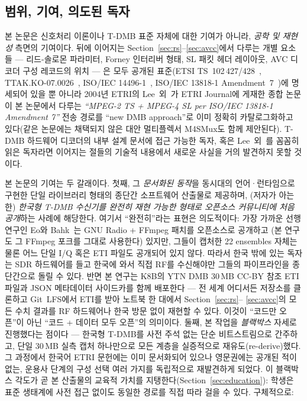 \documentclass[11pt,a4paper]{article}
\begin{document}
\subsection{범위, 기여, 의도된 독자}
본 논문은 신호처리 이론이나 T-DMB 표준 자체에 대한 기여가 아니라,
\emph{공학 및 재현성} 측면의 기여이다.  뒤에 이어지는
Section~\ref{sec:rs}--\ref{sec:avcc}에서 다루는 개별 요소들 ---
리드-솔로몬 파라미터, Forney 인터리버 형태, SL 패킷 헤더 레이아웃,
AVC 디코더 구성 레코드의 위치 --- 은 모두 공개된 표준(ETSI
TS~102\,427/428~\cite{etsi102427,etsi102428},
TTAK.KO-07.0026~\cite{ttak0026},
ISO/IEC 14496-1~\cite{iso14496-1}, ISO/IEC 13818-1
Amendment~7~\cite{iso13818-1-amd7})에 명세되어 있을 뿐 아니라
2004년 ETRI의 Lee~외~\cite{lee2004m4smux}가 ETRI Journal에 게재한
종합 논문이 본 논문에서 다루는 \emph{``MPEG-2 TS + MPEG-4 SL per
ISO/IEC 13818-1 Amendment 7''} 전송 경로를 ``new DMB approach''로
이미 정확히 카탈로그화하고 있다(같은 논문에는 채택되지 않은
대안 멀티플렉서 M4SMux도 함께 제안된다).  T-DMB 하드웨어
디코더의 내부 설계 문서에 접근 가능한 독자, 혹은
Lee~외~\cite{lee2004m4smux}를 꼼꼼히 읽은 독자라면 이어지는
절들의 기술적 내용에서 새로운 사실을 거의 발견하지 못할 것이다.

본 논문의 기여는 두 갈래이다.  첫째, 그 \emph{문서화된 동작}을
동시대의 언어·런타임으로 구현한 단일 라이브러리 형태의 종단간
소프트웨어 산출물로 제공하며, (저자가 아는 한) \emph{한국형 T-DMB
수신기를 완전히 재현 가능한 형태로 오픈소스 커뮤니티에 처음 공개}하는
사례에 해당한다.  여기서 ``완전히''라는 표현은 의도적이다: 가장 가까운
선행 연구인 Eo와 Bahk~\cite{eo2024tdmb}는 GNU Radio + FFmpeg 패치를
오픈소스로 공개하고 (본 연구도 그 FFmpeg 포크를 그대로 사용한다) 있지만,
그들이 캡처한 22 ensembles 자체는 물론 어느 단일 I/Q 혹은 ETI 파일도
공개되어 있지 않다.  따라서 한국 밖에 있는 독자는 SDR 하드웨어를 들고
한국에 와서 직접 RF를 수신해야만 그들의 파이프라인을 종단간으로 돌릴 수
있다.  반면 본 연구는 K8B의 YTN DMB 30\,MB CC-BY 참조 ETI 파일과 JSON
메타데이터 사이드카를 함께 배포한다 --- 전 세계 어디서든 저장소를 클론하고
Git~LFS에서 ETI를 받아 노트북 한 대에서 Section~\ref{sec:rs}--%
\ref{sec:avcc}의 모든 수치 결과를 RF 하드웨어나 한국 방문 없이 재현할 수
있다.  이것이 ``코드만 오픈''이 아닌 ``코드 + 데이터 모두 오픈''의
의미이다.  둘째, 본 작업을
\emph{블랙박스} 자세로 진행했다는 점이다 --- 한국형 T-DMB를 사전
주석 없는 단순 비트스트림으로 간주하고, 단일 30\,MB 실측 캡처
하나만으로 모든 계층을 실증적으로 재유도(re-derive)했다.  그 과정에서
한국어 ETRI 문헌에는 이미 문서화되어 있으나 영문권에는 공개된 적이
없는, 운용사 단계의 구성 선택 여러 가지를 독립적으로 재발견하게
되었다.  이 블랙박스 각도가 곧 본 산출물의 교육적 가치를
지탱한다(Section~\ref{sec:education}): 학생은 표준 생태계에
사전 접근 없이도 동일한 경로를 직접 따라 걸을 수 있다.  구체적으로:
\end{document}
